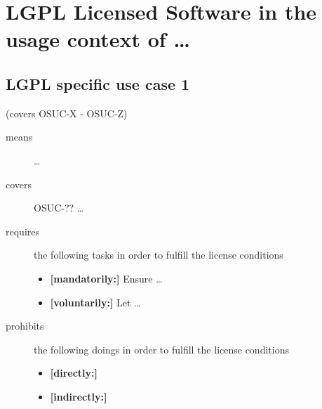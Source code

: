 %
%
%
%
%



\section{LGPL Licensed Software in the usage context of \ldots}
\label{OSUC-01-LGPL} \label{OSUC-03-LGPL} 
\label{OSUC-06-LGPL} \label{OSUC-09-LGPL}

\label{OSUC-02-LGPL} \label{OSUC-04-LGPL} \label{OSUC-05-LGPL}
\label{OSUC-07-LGPL} \label{OSUC-08-LGPL} \label{OSUC-10-LGPL}


\subsection{LGPL specific use case 1}
(covers OSUC-X - OSUC-Z)
\begin{description}
\item[means] \ldots

\item[covers] OSUC-?? \ldots

\item[requires] the following tasks in order to fulfill the license conditions
\begin{itemize}
  \item \textbf{[mandatorily:]} Ensure \ldots
  \item \textbf{[voluntarily:]} Let \ldots
\end{itemize}

\item[prohibits] the following doings in order to fulfill the license conditions
\begin{itemize}
  \item \textbf{[directly:]} 
  \item \textbf{[indirectly:]}
\end{itemize}
\end{description}


